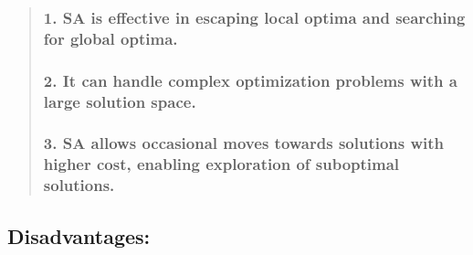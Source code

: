 \documentclass[11pt]{article}
\begin{document}
\begin{quote}
\hypertarget{sa-is-effective-in-escaping-local-optima-and-searching-for-global-optima.}{%
\subsubsection{\texorpdfstring{ 1. SA is effective in escaping local
optima and searching for global
optima.}{  1. SA is effective in escaping local optima and searching for global optima.}}\label{sa-is-effective-in-escaping-local-optima-and-searching-for-global-optima.}}

\hypertarget{it-can-handle-complex-optimization-problems-with-a-large-solution-space.}{%
\subsubsection{\texorpdfstring{ 2. It can handle complex optimization
problems with a large solution
space.}{  2. It can handle complex optimization problems with a large solution space.}}\label{it-can-handle-complex-optimization-problems-with-a-large-solution-space.}}

\hypertarget{sa-allows-occasional-moves-towards-solutions-with-higher-cost-enabling-exploration-of-suboptimal-solutions.}{%
\subsubsection{\texorpdfstring{ 3. SA allows occasional moves towards
solutions with higher cost, enabling exploration of suboptimal
solutions.}{  3. SA allows occasional moves towards solutions with higher cost, enabling exploration of suboptimal solutions.}}\label{sa-allows-occasional-moves-towards-solutions-with-higher-cost-enabling-exploration-of-suboptimal-solutions.}}
\end{quote}

\hypertarget{disadvantages}{%
\subsection{\texorpdfstring{
Disadvantages:}{  Disadvantages:}}\label{disadvantages}}
\end{document}
